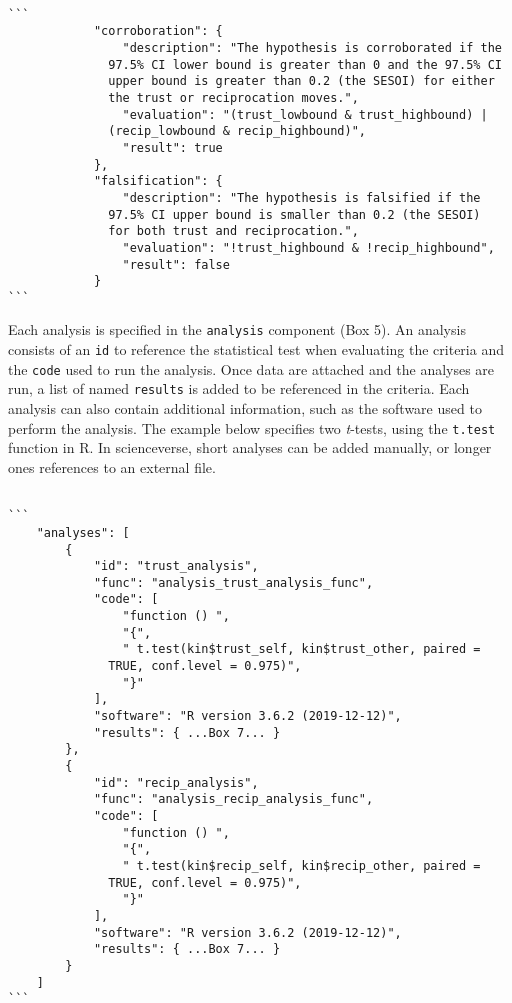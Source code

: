 \documentclass[english,doc,floatsintext]{apa6}
\begin{document}
\begin{tcolorbox}[colback=black!5!white,colframe=white!5!black,title=Box 4. Corroboration and falsification rules.]
\begin{verbatim}

```
            "corroboration": {
                "description": "The hypothesis is corroborated if the
              97.5% CI lower bound is greater than 0 and the 97.5% CI
              upper bound is greater than 0.2 (the SESOI) for either
              the trust or reciprocation moves.",
                "evaluation": "(trust_lowbound & trust_highbound) |
              (recip_lowbound & recip_highbound)",
                "result": true
            },
            "falsification": {
                "description": "The hypothesis is falsified if the
              97.5% CI upper bound is smaller than 0.2 (the SESOI)
              for both trust and reciprocation.",
                "evaluation": "!trust_highbound & !recip_highbound",
                "result": false
            }
```

\end{verbatim}
\end{tcolorbox}

Each analysis is specified in the \texttt{analysis} component (Box 5). An analysis consists of an \texttt{id} to reference the statistical test when evaluating the criteria and the \texttt{code} used to run the analysis. Once data are attached and the analyses are run, a list of named \texttt{results} is added to be referenced in the criteria. Each analysis can also contain additional information, such as the software used to perform the analysis. The example below specifies two \emph{t}-tests, using the \texttt{t.test} function in R. In scienceverse, short analyses can be added manually, or longer ones references to an external file.

\begin{tcolorbox}[colback=black!5!white,colframe=white!5!black,title=Box 5. The analysis component.]
\begin{verbatim}

```
    "analyses": [
        {
            "id": "trust_analysis",
            "func": "analysis_trust_analysis_func",
            "code": [
                "function () ",
                "{",
                " t.test(kin$trust_self, kin$trust_other, paired =
              TRUE, conf.level = 0.975)",
                "}"
            ],
            "software": "R version 3.6.2 (2019-12-12)",
            "results": { ...Box 7... }
        },
        {
            "id": "recip_analysis",
            "func": "analysis_recip_analysis_func",
            "code": [
                "function () ",
                "{",
                " t.test(kin$recip_self, kin$recip_other, paired =
              TRUE, conf.level = 0.975)",
                "}"
            ],
            "software": "R version 3.6.2 (2019-12-12)",
            "results": { ...Box 7... }
        }
    ]
```

\end{verbatim}
\end{tcolorbox}
\end{document}
